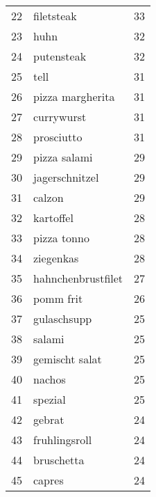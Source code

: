 \begin{tabular}{llr}
22   &                                         filetsteak &     33 \\
23   &                                               huhn &     32 \\
24   &                                         putensteak &     32 \\
25   &                                               tell &     31 \\
26   &                                   pizza margherita &     31 \\
27   &                                         currywurst &     31 \\
28   &                                         prosciutto &     31 \\
29   &                                       pizza salami &     29 \\
30   &                                     jagerschnitzel &     29 \\
31   &                                             calzon &     29 \\
32   &                                          kartoffel &     28 \\
33   &                                        pizza tonno &     28 \\
34   &                                          ziegenkas &     28 \\
35   &                                 hahnchenbrustfilet &     27 \\
36   &                                          pomm frit &     26 \\
37   &                                        gulaschsupp &     25 \\
38   &                                             salami &     25 \\
39   &                                     gemischt salat &     25 \\
40   &                                             nachos &     25 \\
41   &                                            spezial &     25 \\
42   &                                             gebrat &     24 \\
43   &                                      fruhlingsroll &     24 \\
44   &                                         bruschetta &     24 \\
45   &                                             capres &     24 \\

\end{tabular}
